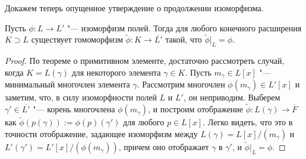 Докажем теперь опущенное утверждение о продолжении изоморфизма.

\begin{proposition}
	Пусть $\phi: L \to L'$ "--- изоморфизм полей. Тогда для любого конечного расширения $K \supset L$ существует гомоморфизм $\widetilde{\phi}: K \to \overline{L'}$ такой, что $\widetilde\phi|_{L} = \phi$.
\end{proposition}

\begin{proof}
	По теореме о примитивном элементе, достаточно рассмотреть случай, когда $K = L(\gamma)$ для некоторого элемента $\gamma \in K$. Пусть $m_\gamma \in L[x]$ "--- минимальный многочлен элемента $\gamma$. Рассмотрим многочлен $\phi(m_\gamma) \in L'[x]$ и заметим, что, в силу изоморфности полей $L$ и $L'$, он неприводим. Выберем $\gamma' \in \overline{L'}$ "--- корень многочлена $\phi(m_\gamma)$, и построим отображение $\widetilde{\phi}: L(\gamma) \to \overline{F}$ как $\widetilde{\phi}(p(\gamma)) := \phi(p)(\gamma')$ для любого $p \in L[x]$. Легко видеть, что это в точности отображение, задающее изоморфизм между $L(\gamma) = L[x] / (m_\gamma)$ и $L'(\gamma') = L'[x] / (\phi(m_\gamma))$, причем оно отображает $\gamma$ в $\gamma'$, и $\widetilde\phi|_L = \phi$.
\end{proof}


